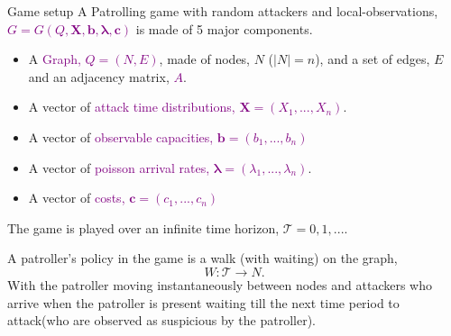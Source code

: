 \documentclass[10pt]{beamer}
\begin{document}
\begin{frame}{Game setup}
A Patrolling game with random attackers and local-observations, \textcolor{purple}{$G=G(Q,\bm{X},\bm{b},\bm{\lambda},\bm{c})$} is made of 5 major components.
\begin{itemize}
\item A \textcolor{purple}{Graph, $Q=(N,E)$}, made of nodes, $N$ ($|N|=n$), and a set of edges, $E$ and an adjacency matrix, \textcolor{purple}{$A$}.
\item A vector of \textcolor{purple}{attack time distributions, $\bm{X}=(X_{1},...,X_{n})$}.
\item A vector of \textcolor{purple}{observable capacities, $\bm{b}=(b_{1},...,b_{n})$}
\item A vector of \textcolor{purple}{poisson arrival rates, $\bm{\lambda}=(\lambda_{1},...,\lambda_{n})$}.
\item A vector of \textcolor{purple}{costs, $\bm{c}=(c_{1},...,c_{n})$}
\end{itemize}

\pause

The game is played over an infinite time horizon, $\mathcal{T}={0,1,....}$

A patroller's policy in the game is a walk (with waiting) on the graph,
$$W: \mathcal{T} \rightarrow N .$$
With the patroller moving instantaneously between nodes and attackers who arrive when the patroller is present waiting till the next time period to attack(who are observed as suspicious by the patroller).
\end{frame}
\end{document}
